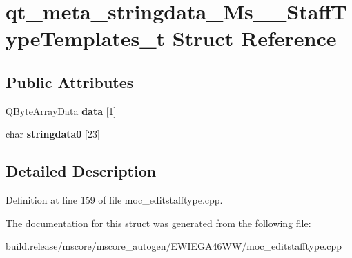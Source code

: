 \hypertarget{structqt__meta__stringdata___ms_____staff_type_templates__t}{}\section{qt\+\_\+meta\+\_\+stringdata\+\_\+\+Ms\+\_\+\+\_\+\+Staff\+Type\+Templates\+\_\+t Struct Reference}
\label{structqt__meta__stringdata___ms_____staff_type_templates__t}
\subsection*{Public Attributes}
\begin{DoxyCompactItemize}
\item 
\mbox{\label{structqt__meta__stringdata___ms_____staff_type_templates__t_a02ed1af9a32b93685b162032190ceda4}} 
Q\+Byte\+Array\+Data {\bfseries data} \mbox{[}1\mbox{]}
\item 
\mbox{\label{structqt__meta__stringdata___ms_____staff_type_templates__t_ac6b45a012d62988594bf42bcfb24850f}} 
char {\bfseries stringdata0} \mbox{[}23\mbox{]}
\end{DoxyCompactItemize}


\subsection{Detailed Description}


Definition at line 159 of file moc\+\_\+editstafftype.\+cpp.



The documentation for this struct was generated from the following file\+:\begin{DoxyCompactItemize}
\item 
build.\+release/mscore/mscore\+\_\+autogen/\+E\+W\+I\+E\+G\+A46\+W\+W/moc\+\_\+editstafftype.\+cpp\end{DoxyCompactItemize}
